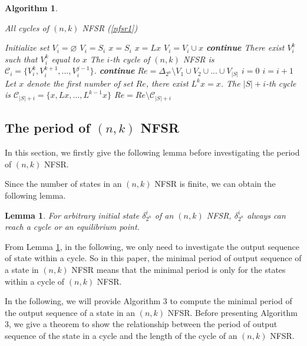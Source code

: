 \documentclass[conference]{IEEEtran}
\newtheorem{lemma}{Lemma}
\newtheorem{algorithm}{Algorithm}
\begin{document}
\begin{algorithm}\label{al1}
\caption{All cycles of $(n,k)$ NFSR (\ref{nfsr1})}
\begin{algorithmic}[1]
\STATE Initialize set $V_i=\varnothing$
\STATE $V_i=S_i$
\STATE $x=S_i$
\STATE  $x=Lx$
\STATE $V_i=V_i\cup x$
\STATE \textbf{continue}
\ENDIF
\ELSE
\STATE There exist $V^k_i$ such that $V^k_i$ equal to $x$
\STATE The $i$-th cycle of $(n,k)$ NFSR is $\mathcal{C}_i=\{V^k_i,V^{k+1}_i,...,V^{j-1}_i\}$.
\STATE \textbf{continue}
\ENDIF
\ENDFOR
\ENDFOR
\STATE $Re=\Delta_{2^n} \setminus V_1\cup V_2\cup...\cup V_{|S|}$
\STATE $i=0$
\STATE $i=i+1$
\STATE Let $x$ denote the first number of set $Re$, there exist $L^k x=x$.
\STATE The $|S|+i$-th cycle is $\mathcal{C}_{|S|+i}=\{x,Lx,...,L^{k-1}x\}$
\STATE $Re=Re\setminus \mathcal{C}_{|S|+i}$
\ENDWHILE
\end{algorithmic}
\end{algorithm}

\subsection{The period of $(n,k)$ NFSR}
In this section, we firstly give the following lemma before investigating the period of $(n,k)$ NFSR.

Since the number of states in an $(n,k)$ NFSR is finite, we can obtain the following lemma.
\begin{lemma}\label{lemma2}
For arbitrary initial state $\delta^i_{2^n}$ of an $(n,k)$ NFSR, $\delta^i_{2^n}$ always can reach a cycle or an equilibrium point.
\end{lemma}

From Lemma \ref{lemma2}, in the following, we only need to investigate the output sequence of state within a cycle. So in this paper, the minimal period of output sequence of a state in $(n,k)$ NFSR means that the minimal period is only for the states within a cycle of $(n,k)$ NFSR.

In the following, we will provide Algorithm 3 to compute the minimal period of the output sequence of a state in an $(n,k)$ NFSR. Before presenting Algorithm 3, we give a theorem to show the relationship between the period of output sequence of the state in a cycle and the length of the cycle of an $(n,k)$ NFSR.
\end{document}
